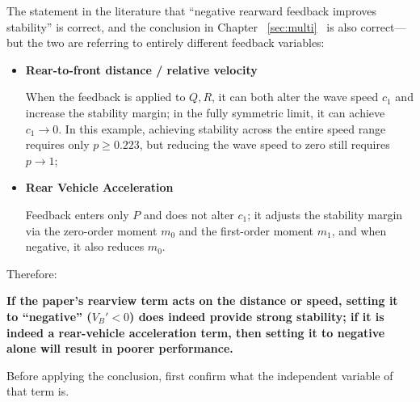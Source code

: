\documentclass[11pt,a4paper,openany]{book}
\numberwithin{equation}{chapter}
\numberwithin{figure}{chapter}
\numberwithin{table}{chapter}
\begin{document}
\begin{tcolorbox}[notebox,title=\textbf{Returning to that question}]

The statement in the literature that “negative rearward feedback improves stability” is correct, and the conclusion in Chapter ~\ref{sec:multi}~ is also correct—but the two are referring to entirely different feedback variables:







\begin{itemize}[leftmargin=1.2em,itemsep=3pt]
\item \textbf{Rear-to-front distance / relative velocity}




When the feedback is applied to $Q,R$, it can both alter the wave speed $c_1$ and increase the stability margin; in the fully symmetric limit, it can achieve $c_1\to0$. In this example, achieving stability across the entire speed range requires only $p\ge0.223$, but reducing the wave speed to zero still requires $p\to1$;







\item \textbf{Rear Vehicle Acceleration}




Feedback enters only $P$ and does not alter $c_1$; it adjusts the stability margin via the zero-order moment $m_0$ and the first-order moment $m_1$, and when negative, it also reduces $m_0$.







\end{itemize}







Therefore:




\textbf{If the paper’s rearview term acts on the distance or speed, setting it to “negative” ($V_B'<0$) does indeed provide strong stability; if it is indeed a rear-vehicle acceleration term, then setting it to negative alone will result in poorer performance.}




Before applying the conclusion, first confirm what the independent variable of that term is.







\end{tcolorbox}
\end{document}

